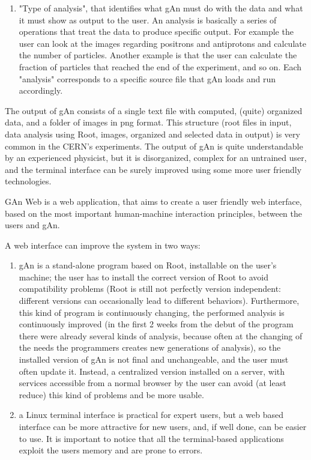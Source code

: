 \begin{enumerate}
\item "Type of analysis", that identifies what gAn must do with the data and what it must show as output to the user.
An analysis is basically a series of operations that treat the data to produce specific output. For example the user can look at the images regarding positrons and antiprotons and calculate the number of particles. Another example is that the user can calculate the fraction of particles that reached the end of the experiment, and so on. Each "analysis" corresponds to a specific source file that gAn loads and run accordingly.

\end{enumerate}


The output of gAn consists of a single text file with computed, (quite) organized data, and a folder of images in png format.
This structure (root files in input, data analysis using Root, images, organized and selected data in output) is very common in the CERN's experiments. 
The output of gAn is quite understandable by an experienced physicist, but it is disorganized, complex for an untrained user, and the terminal interface can be surely improved using some more user friendly technologies.

GAn Web is a web application, that aims to create a user friendly web interface, based on the most important human-machine interaction principles, between the users and gAn. 

A web interface can improve the system in two ways:

\begin{enumerate}

\item gAn is a stand-alone program based on Root, installable on the user's machine; the user has to install the correct version of Root to avoid compatibility problems (Root is still not perfectly version independent: different versions can occasionally lead to different behaviors). Furthermore, this kind of program is continuously changing, the performed analysis is continuously improved (in the first 2 weeks from the debut of the program there were already several kinds of analysis, because often at the changing of the needs the programmers creates new generations of analysis), so the installed version of gAn is not final and unchangeable, and the user must often update it. Instead, a centralized version installed on a server, with services accessible from a normal browser by the user can avoid (at least reduce) this kind of problems and be more usable.    
 

\item a Linux terminal interface is practical for expert users, but a web based interface can be more attractive for new users, and, if well done, can be easier to use. It is important to notice that all the terminal-based applications exploit the users memory and are prone to errors.


\end{enumerate}



